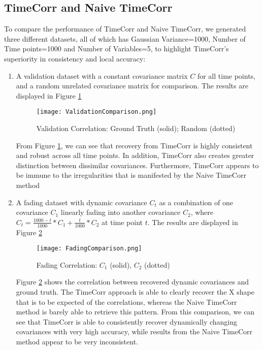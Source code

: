 \documentclass[12pt]{article}
\begin{document}
\subsection{TimeCorr and Naive TimeCorr}
To compare the performance of TimeCorr and Naive TimeCorr, we generated three different datasets, all of which has Gaussian Variance=1000, Number of Time points=1000 and Number of Variables=5, to highlight TimeCorr's superiority in consistency and local accuracy:
\begin{enumerate}
\item A validation dataset with a constant covariance matrix $C$ for all time points, and a random unrelated covariance matrix for comparison. The results are displayed in Figure \ref{fig:validation}\par
\begin{figure}[h]
\caption{Validation Correlation: Ground Truth (solid); Random (dotted)}
\centering
\texttt{[image: ValidationComparison.png]}
\label{fig:validation}
\end{figure}
From Figure \ref{fig:validation}, we can see that recovery from TimeCorr is highly consistent and robust across all time points. In addition, TimeCorr also creates greater distinction between dissimilar covariances. Furthermore, TimeCorr appears to be immune to the irregularities that is manifested by the Naive TimeCorr method\par

\item A fading dataset with dynamic covariance $C_t$ as a combination of one covariance $C_1$ linearly fading into another covariance $C_2$, where $C_t = \frac{1000-t}{1000}*C_1+\frac{t}{1000}*C_2$ at time point $t$. The results are displayed in Figure \ref{fig:fading}\par
\begin{figure}[h]
\caption{Fading Correlation: $C_1$ (solid), $C_2$ (dotted)}
\centering
\texttt{[image: FadingComparison.png]}
\label{fig:fading}
\end{figure}
Figure \ref{fig:fading} shows the correlation between recovered dynamic covariances and ground truth. The TimeCorr approach is able to clearly recover the X shape that is to be expected of the correlations, whereas the Naive TimeCorr method is barely able to retrieve this pattern. From this comparison, we can see that TimeCorr is able to consistently recover dynamically changing covariances with very high accuracy, while results from the Naive TimeCorr method appear to be very inconsistent.


\end{enumerate}
\end{document}
